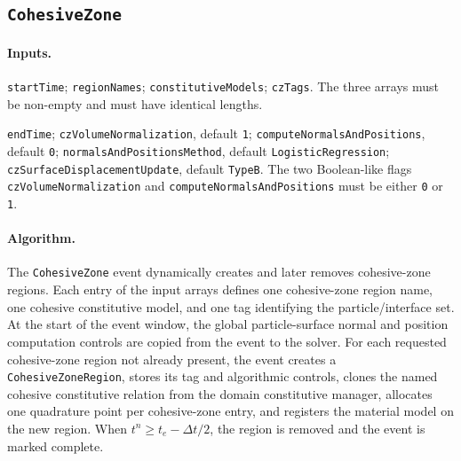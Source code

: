 \subsection{\texttt{CohesiveZone}}
\label{sec:event-cohesivezone}
\label{subsec:event-cohesive-zone}

\paragraph{Inputs.}
\begin{description}[leftmargin=*,style=nextline]
\item[\textbf{Required.}] \texttt{startTime}; \texttt{regionNames}; \texttt{constitutiveModels}; \texttt{czTags}.  The three arrays must be non-empty and must have identical lengths.
\item[\textbf{Optional.}] \texttt{endTime}; \texttt{czVolumeNormalization}, default \texttt{1}; \texttt{computeNormalsAndPositions}, default \texttt{0}; \texttt{normalsAndPositionsMethod}, default \texttt{LogisticRegression}; \texttt{czSurfaceDisplacementUpdate}, default \texttt{TypeB}.  The two Boolean-like flags \texttt{czVolumeNormalization} and \texttt{computeNormalsAndPositions} must be either \texttt{0} or \texttt{1}.
\end{description}

\paragraph{Algorithm.}
The \texttt{CohesiveZone} event dynamically creates and later removes cohesive-zone regions.  Each entry of the input arrays defines one cohesive-zone region name, one cohesive constitutive model, and one tag identifying the particle/interface set.  At the start of the event window, the global particle-surface normal and position computation controls are copied from the event to the solver.  For each requested cohesive-zone region not already present, the event creates a \texttt{CohesiveZoneRegion}, stores its tag and algorithmic controls, clones the named cohesive constitutive relation from the domain constitutive manager, allocates one quadrature point per cohesive-zone entry, and registers the material model on the new region.  When $t^n \ge t_e-\Delta t/2$, the region is removed and the event is marked complete.

